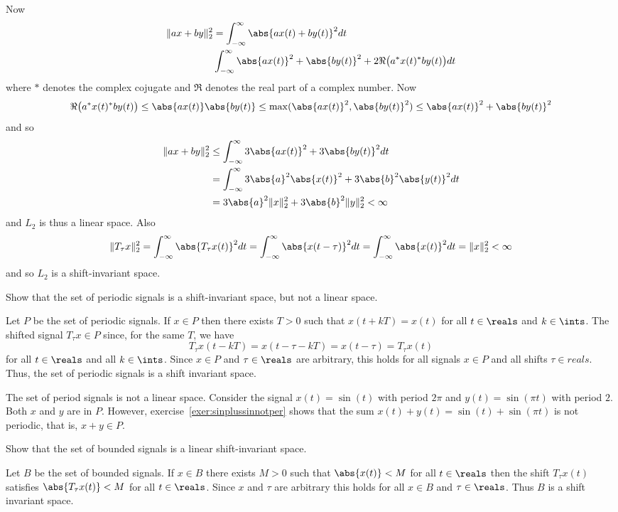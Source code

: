 \begin{excersizelist}
\begin{solution}
Now
\begin{align*}
\|a x + b y\|_2^2 &= \int_{-\infty}^\infty \abs{ax(t) + by(t)}^2 dt \\
& \int_{-\infty}^\infty \abs{a x(t)}^2 + \abs{ b y(t)}^2 + 2 \Re\big( a^* x(t)^* b y(t) \big) dt
\end{align*}
where $*$ denotes the complex cojugate and $\Re$ denotes the real part of a complex number.  Now
\[
\Re\big( a^* x(t)^* b y(t) \big) \leq \abs{a x(t)} \abs{b y(t)} \leq \max(\abs{a x(t)}^2, \abs{b y(t)}^2) \leq \abs{a x(t)}^2 + \abs{b y(t)}^2
\]
and so
\begin{align*}
\|a x + b y\|_2^2 &\leq \int_{-\infty}^\infty 3\abs{a x(t)}^2 + 3\abs{ b y(t)}^2 dt \\
&= \int_{-\infty}^\infty 3\abs{a}^2\abs{x(t)}^2 + 3\abs{b}^2\abs{ y(t)}^2 dt \\
&= 3 \abs{a}^2 \|x\|_2^2 + 3 \abs{b}^2 \|y\|_2^2 < \infty
\end{align*}
and $L_2$ is thus a linear space.  Also
\[
\|T_\tau x\|_2^2 = \int_{-\infty}^\infty \abs{ T_\tau x(t) }^2 dt = \int_{-\infty}^\infty \abs{x(t - \tau)}^2 dt = \int_{-\infty}^\infty \abs{x(t)}^2 dt = \|x\|_2^2 < \infty
\]
and so $L_2$ is a shift-invariant space.
\end{solution}

\item \label{exer:periodicshiftinvariantnotlinear} Show that the set of periodic signals is a shift-invariant space, but not a linear space.
\begin{solution}
Let $P$ be the set of periodic signals.  If $x \in P$ then there exists $T > 0$ such that $x(t + kT) = x(t)$ for all $t \in \reals$ and $k \in \ints$.  The shifted signal $T_\tau x \in P$ since, for the same $T$, we have
\[
T_\tau x(t - kT) = x(t - \tau - kT) = x(t - \tau) = T_\tau x(t)
\]
for all $t \in \reals$ and all $k \in \ints$.  Since $x \in P$ and $\tau \in \reals$ are arbitrary, this holds for all signals $x \in P$ and all shifts $\tau \in reals$.   Thus, the set of periodic signals is a shift invariant space.

The set of period signals is not a linear space.  Consider the signal $x(t) = \sin(t)$ with period $2\pi$ and $y(t) = \sin(\pi t)$ with period $2$.  Both $x$ and $y$ are in $P$.  However, exercise~\ref{exer:sinplussinnotper} shows that the sum $x(t) + y(t) = \sin(t) + \sin(\pi t)$ is not periodic, that is, $x + y \in P$.
\end{solution}

\item \label{exer:boundedlinearshiftinvar} Show that the set of bounded signals is a linear shift-invariant space.
\begin{solution}
Let $B$ be the set of bounded signals.  If $x \in B$ there exists $M > 0$ such that $\abs{x(t)} < M$ for all $t \in \reals$ then the shift $T_\tau x(t)$ satisfies $\abs{T_\tau x(t)} < M$ for all $t \in \reals$.  Since $x$ and $\tau$ are arbitrary this holds for all $x \in B$ and $\tau \in \reals$.  Thus $B$ is a shift invariant space.


\end{solution}
\end{excersizelist}
